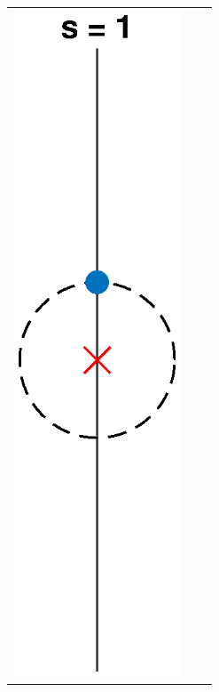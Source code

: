\documentclass[thesis.tex]{subfiles}
\begin{document}
\begin{figure}
\begin{center}
\begin{tabular}{ccc}
\includegraphics[width=5cm]{images/kreinbubbles/bubbleR} \\

\end{tabular}
\end{center}
\end{figure}
\end{document}
